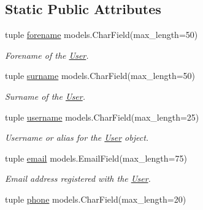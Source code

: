 \subsection*{Static Public Attributes}
\begin{DoxyCompactItemize}
\item 
\hypertarget{class_learn_1_1models_1_1_user_a90bee78e749e518923cbb4934582401a}{tuple \hyperlink{class_learn_1_1models_1_1_user_a90bee78e749e518923cbb4934582401a}{forename} models.\-Char\-Field(max\-\_\-length=50)}\label{class_learn_1_1models_1_1_user_a90bee78e749e518923cbb4934582401a}

\begin{DoxyCompactList}\small\item\em Forename of the \hyperlink{class_learn_1_1models_1_1_user}{User}. \end{DoxyCompactList}\item 
\hypertarget{class_learn_1_1models_1_1_user_a2e5e150422fc3c1e31af7df2c0cfefb9}{tuple \hyperlink{class_learn_1_1models_1_1_user_a2e5e150422fc3c1e31af7df2c0cfefb9}{surname} models.\-Char\-Field(max\-\_\-length=50)}\label{class_learn_1_1models_1_1_user_a2e5e150422fc3c1e31af7df2c0cfefb9}

\begin{DoxyCompactList}\small\item\em Surname of the \hyperlink{class_learn_1_1models_1_1_user}{User}. \end{DoxyCompactList}\item 
\hypertarget{class_learn_1_1models_1_1_user_a042ac88deb5e3d1fb6022e318eae34b1}{tuple \hyperlink{class_learn_1_1models_1_1_user_a042ac88deb5e3d1fb6022e318eae34b1}{username} models.\-Char\-Field(max\-\_\-length=25)}\label{class_learn_1_1models_1_1_user_a042ac88deb5e3d1fb6022e318eae34b1}

\begin{DoxyCompactList}\small\item\em Username or alias for the \hyperlink{class_learn_1_1models_1_1_user}{User} object. \end{DoxyCompactList}\item 
\hypertarget{class_learn_1_1models_1_1_user_a7be9250587aecff1dc9b276b0fa7aa94}{tuple \hyperlink{class_learn_1_1models_1_1_user_a7be9250587aecff1dc9b276b0fa7aa94}{email} models.\-Email\-Field(max\-\_\-length=75)}\label{class_learn_1_1models_1_1_user_a7be9250587aecff1dc9b276b0fa7aa94}

\begin{DoxyCompactList}\small\item\em Email address registered with the \hyperlink{class_learn_1_1models_1_1_user}{User}. \end{DoxyCompactList}\item 
\hypertarget{class_learn_1_1models_1_1_user_ac5a80def84659153520d3ee4997b6823}{tuple \hyperlink{class_learn_1_1models_1_1_user_ac5a80def84659153520d3ee4997b6823}{phone} models.\-Char\-Field(max\-\_\-length=20)}\label{class_learn_1_1models_1_1_user_ac5a80def84659153520d3ee4997b6823}


\end{DoxyCompactItemize}
